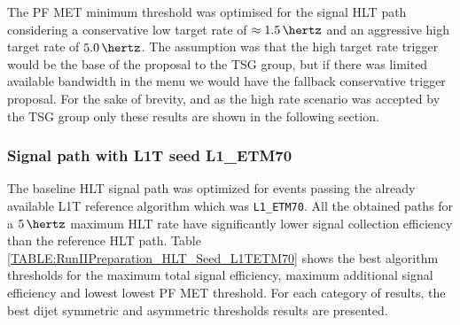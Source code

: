 The \gls{PF} \gls{MET} minimum threshold was optimised for the signal \gls{HLT} path considering a conservative low target rate of $\approx 1.5\,\hertz$ and an aggressive high target rate  of $5.0\,\hertz$. The assumption was that the high target rate trigger would be the base of the proposal to the \gls{TSG} group, but if there was limited available bandwidth in the menu we would have the fallback conservative trigger proposal. For the sake of brevity, and as the high rate scenario was accepted by the \gls{TSG} group only these results are shown in the following section.

\subsubsection{Signal path with L1T seed L1\_ETM70}
\label{SECTION:RunIITriggerStudies_HLTAlgorithmDevelopment_L1ETM70}


The baseline \gls{HLT} signal path was optimized for events passing the already available \gls{L1T} reference algorithm which was \verb|L1_ETM70|. All the obtained paths for a $5\,\hertz$ maximum \gls{HLT} rate have significantly lower signal collection efficiency than the reference \gls{HLT} path. Table \ref{TABLE:RunIIPreparation_HLT_Seed_L1TETM70} shows the best algorithm thresholds for the maximum total signal efficiency, maximum additional signal efficiency and lowest lowest \gls{PF} \gls{MET} threshold. For each category of results, the best dijet symmetric and asymmetric \pt thresholds results are presented.


